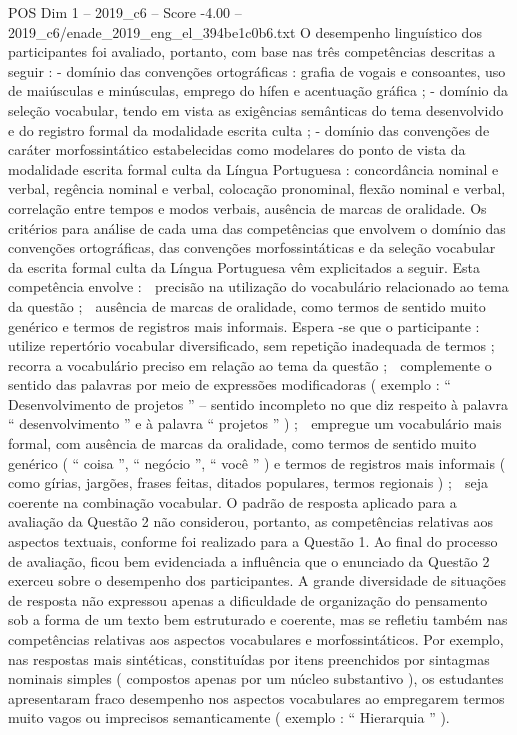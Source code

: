 \begin{textsample}{POS Dim 1 – 2019\_c6 – Score -4.00 – 2019\_c6/enade\_2019\_eng\_el\_394be1c0b6.txt}
O desempenho linguístico dos participantes foi avaliado, portanto, com base nas três competências descritas a seguir : - domínio das convenções ortográficas : grafia de vogais e consoantes, uso de maiúsculas e minúsculas, emprego do hífen e acentuação gráfica ; - domínio da seleção vocabular, tendo em vista as exigências semânticas do tema desenvolvido e do registro formal da modalidade escrita culta ; - domínio das convenções de caráter morfossintático estabelecidas como modelares do ponto de vista da modalidade escrita formal culta da Língua Portuguesa : concordância nominal e verbal, regência nominal e verbal, colocação pronominal, flexão nominal e verbal, correlação entre tempos e modos verbais, ausência de marcas de oralidade.
Os critérios para análise de cada uma das competências que envolvem o domínio das convenções ortográficas, das convenções morfossintáticas e da seleção vocabular da escrita formal culta da Língua Portuguesa vêm explicitados a seguir.
Esta competência envolve :  precisão na utilização do vocabulário relacionado ao tema da questão ;  ausência de marcas de oralidade, como termos de sentido muito genérico e termos de registros mais informais.
Espera -se que o participante :  utilize repertório vocabular diversificado, sem repetição inadequada de termos ;  recorra a vocabulário preciso em relação ao tema da questão ;  complemente o sentido das palavras por meio de expressões modificadoras ( exemplo : “ Desenvolvimento de projetos ” – sentido incompleto no que diz respeito à palavra “ desenvolvimento ” e à palavra “ projetos ” ) ;  empregue um vocabulário mais formal, com ausência de marcas da oralidade, como termos de sentido muito genérico ( “ coisa ”, “ negócio ”, “ você ” ) e termos de registros mais informais ( como gírias, jargões, frases feitas, ditados populares, termos regionais ) ;  seja coerente na combinação vocabular.
O padrão de resposta aplicado para a avaliação da Questão 2 não considerou, portanto, as competências relativas aos aspectos textuais, conforme foi realizado para a Questão 1.
Ao final do processo de avaliação, ficou bem evidenciada a influência que o enunciado da Questão 2 exerceu sobre o desempenho dos participantes.
A grande diversidade de situações de resposta não expressou apenas a dificuldade de organização do pensamento sob a forma de um texto bem estruturado e coerente, mas se refletiu também nas competências relativas aos aspectos vocabulares e morfossintáticos.
Por exemplo, nas respostas mais sintéticas, constituídas por itens preenchidos por sintagmas nominais simples ( compostos apenas por um núcleo substantivo ), os estudantes apresentaram fraco desempenho nos aspectos vocabulares ao empregarem termos muito vagos ou imprecisos semanticamente ( exemplo : “ Hierarquia ” ).

\end{textsample}
